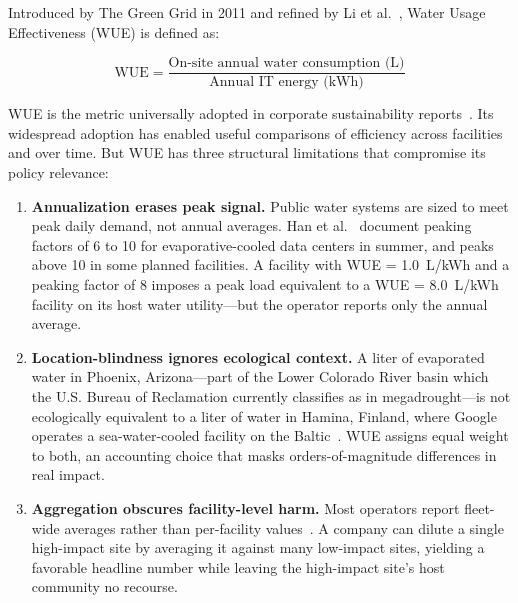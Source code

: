 \documentclass[conference,10pt]{IEEEtran}
\begin{document}
Introduced by The Green Grid in 2011 and refined by Li et
al.~\cite{li2023thirsty}, Water Usage Effectiveness (WUE) is defined as:

\begin{equation}
\textrm{WUE} = \frac{\textrm{On-site annual water consumption (L)}}
                    {\textrm{Annual IT energy (kWh)}}
\label{eq:wue}
\end{equation}

WUE is the metric universally adopted in corporate sustainability
reports~\cite{google2025envreport, microsoft2024sustain, meta2025sustain,
amazon2024aws, equinix2024sustain}. Its widespread adoption has enabled
useful comparisons of efficiency across facilities and over time. But
WUE has three structural limitations that compromise its policy
relevance:

\begin{enumerate}
    \item \textbf{Annualization erases peak signal.} Public water
        systems are sized to meet peak daily demand, not annual
        averages. Han et al.~\cite{han2026} document peaking factors of
        6 to 10 for evaporative-cooled data centers in summer, and
        peaks above 10 in some planned facilities. A facility with
        WUE = 1.0~L/kWh and a peaking factor of 8 imposes a peak load
        equivalent to a WUE = 8.0~L/kWh facility on its host water
        utility---but the operator reports only the annual average.

    \item \textbf{Location-blindness ignores ecological context.} A
        liter of evaporated water in Phoenix, Arizona---part of the
        Lower Colorado River basin which the U.S. Bureau of Reclamation
        currently classifies as in megadrought---is not ecologically
        equivalent to a liter of water in Hamina, Finland, where Google
        operates a sea-water-cooled facility on the
        Baltic~\cite{google2025envreport}. WUE assigns equal weight to
        both, an accounting choice that masks orders-of-magnitude
        differences in real impact.

    \item \textbf{Aggregation obscures facility-level harm.} Most
        operators report fleet-wide averages rather than per-facility
        values~\cite{microsoft2024sustain, meta2025sustain,
        amazon2024aws}. A company can dilute a single high-impact site
        by averaging it against many low-impact sites, yielding a
        favorable headline number while leaving the high-impact site's
        host community no recourse.
\end{enumerate}
\end{document}
